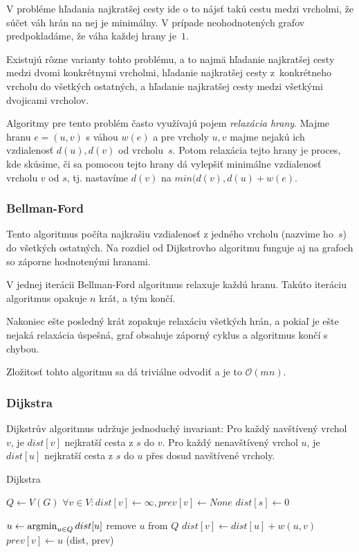 V probléme hľadania najkratšej cesty ide o to nájsť takú cestu
medzi vrcholmi, že súčet váh hrán na nej je minimálny. V prípade
neohodnotených grafov predpokladáme, že váha každej hrany je~$1$.

Existujú rôzne varianty tohto problému, a to najmä hľadanie najkratšej
cesty medzi dvomi konkrétnymi vrcholmi, hľadanie najkratšej cesty
z~konkrétneho vrcholu do všetkých ostatných, a hľadanie najkratšej
cesty medzi všetkými dvojicami vrcholov.

Algoritmy pre tento problém často využívajú pojem {\em relaxácia hrany}.
Majme hranu $e=(u,v)$ s váhou $w(e)$ a pre vrcholy $u,v$ majme nejakú
ich vzdialenosť $d(u), d(v)$ od vrcholu~$s$. Potom relaxácia tejto
hrany je proces, kde skúsime, či sa pomocou tejto hrany dá
vylepšiť minimálne vzdialenosť vrcholu $v$ od $s$, tj. nastavíme
$d(v)$ na $min(d(v),d(u)+w(e)$.

\subsubsection{Bellman-Ford}
Tento algoritmus počíta najkrašiu vzdialenosť z jedného vrcholu
(nazvime ho~$s$) do všetkých ostatných. Na rozdiel od Dijkstrovho
algoritmu funguje aj na grafoch so záporne hodnotenými hranami.

V jednej iterácii Bellman-Ford algoritmus relaxuje každú hranu.
Takúto iteráciu algoritmus opakuje $n$ krát, a tým končí. 

Nakoniec ešte posledný krát zopakuje relaxáciu všetkých hrán,
a pokiaľ je ešte nejaká relaxácia úspešná, graf obsahuje 
záporný cyklus a algoritmus končí s chybou.

Zložitosť tohto algoritmu sa dá triviálne odvodiť a je to $\mathcal{O}(mn)$.

\subsubsection{Dijkstra}
Dijkstrův algoritmus udržuje jednoduchý invariant:
Pro každý navštívený vrchol~$v$, je $dist[v]$ nejkratší cesta z $s$ do
$v$. Pro každý nenavštívený vrchol $u$, je $dist[u]$ nejkratší cesta z
$s$ do $u$ přes dosud navštívené vrcholy.

\begin{algorithm}[h]
\caption{Dijkstra}
\begin{algorithmic}[1]
    \State $Q \gets V(G)$
    \State $\forall v \in V : dist[v] \gets \infty, prev[v] \gets None$
    \State $dist[s] \gets 0$

        \State $u \gets \operatorname*{\arg\!\min}_{u \in Q} dist[u]$
        \State remove $u$ from $Q$
                \State $dist[v] \gets dist[u] + w(u,v) $
                \State $prev[v] \gets u$
            \EndIf
        \EndFor
    \EndWhile
    \State \Return (dist, prev)
\EndFunction
\end{algorithmic}
\end{algorithm}

